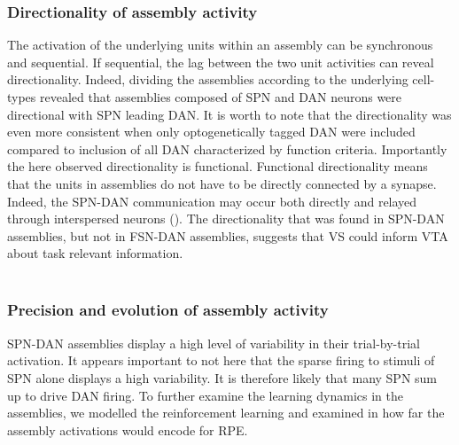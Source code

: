 \subsubsection{Directionality of assembly activity} 
The activation of the underlying units within an assembly can be synchronous and sequential. If sequential, the lag between the two unit activities can reveal directionality. Indeed, dividing the assemblies according to the underlying cell-types revealed that assemblies composed of SPN and DAN neurons were directional with SPN leading DAN. It is worth to note that the directionality was even more consistent when only optogenetically tagged DAN were included compared to inclusion of all DAN characterized by function criteria. Importantly the here observed directionality is functional. Functional directionality means that the units in assemblies do not have to be directly connected by a synapse. Indeed, the SPN-DAN communication may occur both directly and relayed through interspersed neurons (\cite{Ikemoto}). The directionality that was found in SPN-DAN assemblies, but not in FSN-DAN assemblies, suggests that VS could inform VTA about task relevant information. \\\\
\subsubsection{Precision and evolution of assembly activity} 
SPN-DAN assemblies display a high level of variability in their trial-by-trial activation.  It appears important to not here that the sparse firing to stimuli of SPN alone displays a high variability. It is therefore likely that many SPN sum up to drive DAN firing. To further examine the learning dynamics in the assemblies, we modelled the reinforcement learning and examined in how far the assembly activations would encode for RPE.\\\\
